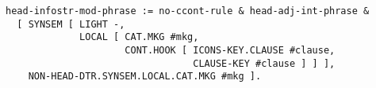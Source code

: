 \documentclass[a4paper]{article}
\begin{document}
{\small\begin{verbatim}
head-infostr-mod-phrase := no-ccont-rule & head-adj-int-phrase &
  [ SYNSEM [ LIGHT -,
             LOCAL [ CAT.MKG #mkg,
                     CONT.HOOK [ ICONS-KEY.CLAUSE #clause,
                                 CLAUSE-KEY #clause ] ] ],
    NON-HEAD-DTR.SYNSEM.LOCAL.CAT.MKG #mkg ].
\end{verbatim}}
\end{document}
